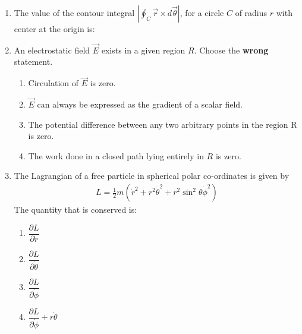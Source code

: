 \documentclass[14pt, a4paper]{extarticle}
\begin{document}
\begin{enumerate}[label=\textbf{Q. \arabic*}]

\item The value of the contour integral
    $ \left| \oint_C \vec{r} \times d\vec{\theta} \right| $,
    for a circle $C$ of radius $r$ with center at the origin is:
    \begin{enumerate}
    \end{enumerate}

\item An electrostatic field $\vec{E}$ exists in a given region $R$. Choose the \textbf{wrong} statement.
   
    \begin{enumerate}
        \item Circulation of $\vec{E}$ is zero.
        \item $\vec{E}$ can always be expressed as the gradient of a scalar field.
        \item The potential difference between any two arbitrary points in the region R is zero.
        \item The work done in a closed path lying entirely in $R$ is zero.   
    \end{enumerate}


\item The Lagrangian of a free particle in spherical polar co-ordinates is given by
    \begin{align*}
    L = \frac{1}{2}m(\dot{r}^2 + r^2\dot{\theta}^2 + r^2\sin^2\theta\dot{\phi}^2)
    \end{align*}
    The quantity that is conserved is:
    \begin{multicols}{2}
    \begin{enumerate}
        \item $\dfrac{\partial L}{\partial \dot{r}}$
        \item $\dfrac{\partial L}{\partial \dot{\theta}}$
        \item $\dfrac{\partial L}{\partial \dot{\phi}}$
        \item $\dfrac{\partial L}{\partial \dot{\phi}} + r \dot{\theta}$
    \end{enumerate}
    \end{multicols}


\end{enumerate}
\end{document}
